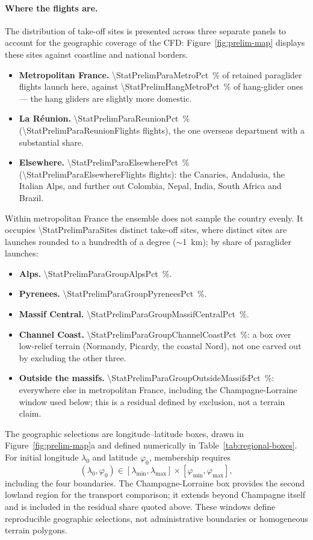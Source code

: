 \paragraph{Where the flights are.}
The distribution of take-off sites is presented across three separate panels to account for
the geographic coverage of the CFD: Figure~\ref{fig:prelim-map} displays these sites against
coastline and national borders.
\begin{itemize}
  \item \textbf{Metropolitan France.} \SI{\StatPrelimParaMetroPct}{\percent} of retained
        paraglider flights launch here, against \SI{\StatPrelimHangMetroPct}{\percent} of
        hang-glider ones --- the hang gliders are slightly more domestic.
  \item \textbf{La R\'eunion.} \SI{\StatPrelimParaReunionPct}{\percent}
        (\num{\StatPrelimParaReunionFlights} flights), the one overseas department with a
        substantial share.
  \item \textbf{Elsewhere.} \SI{\StatPrelimParaElsewherePct}{\percent}
        (\num{\StatPrelimParaElsewhereFlights} flights): the Canaries, Andalusia, the
        Italian Alps, and further out Colombia, Nepal, India, South Africa and Brazil.
\end{itemize}

Within metropolitan France the ensemble does not sample the country evenly. It occupies
\num{\StatPrelimParaSites} distinct take-off sites, where distinct sites are launches
rounded to a hundredth of a degree ($\sim$\SI{1}{\kilo\meter}); by share of paraglider
launches:
\begin{itemize}
  \item \textbf{Alps.} \SI{\StatPrelimParaGroupAlpsPct}{\percent}.
  \item \textbf{Pyrenees.} \SI{\StatPrelimParaGroupPyreneesPct}{\percent}.
  \item \textbf{Massif Central.} \SI{\StatPrelimParaGroupMassifCentralPct}{\percent}.
  \item \textbf{Channel Coast.} \SI{\StatPrelimParaGroupChannelCoastPct}{\percent}: a box
        over low-relief terrain (Normandy, Picardy, the coastal Nord), not one
        carved out by excluding the other three.
  \item \textbf{Outside the massifs.} \SI{\StatPrelimParaGroupOutsideMassifsPct}{\percent}:
        everywhere else in metropolitan France, including the Champagne-Lorraine
        window used below; this is a residual defined by exclusion, not a terrain claim.
\end{itemize}
The geographic selections are longitude--latitude boxes, drawn in
Figure~\ref{fig:prelim-map}a and defined numerically in Table~\ref{tab:regional-boxes}.
For initial longitude $\lambda_0$ and latitude $\varphi_0$, membership requires
\[
 (\lambda_0,\varphi_0)\in
 [\lambda_{\min},\lambda_{\max}]\times[\varphi_{\min},\varphi_{\max}],
\]
including the four boundaries. The Champagne-Lorraine box provides the second
lowland region for the transport comparison; it extends beyond Champagne itself
and is included in the residual share quoted above. These windows define
reproducible geographic selections, not administrative boundaries or homogeneous
terrain polygons.

